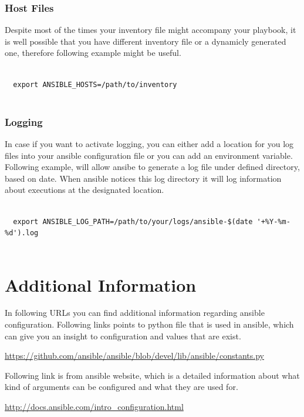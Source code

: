 \documentclass[10pt]{book}
\begin{document}
 

\subsubsection{Host Files}
Despite most of the times your inventory file might accompany your playbook, it 
is well possible that you have different inventory file or a dynamicly generated 
one, therefore following example might be useful.  

\begin{verbatim}
  
  export ANSIBLE_HOSTS=/path/to/inventory
   
\end{verbatim}



\subsubsection{Logging}
In case if you want to activate logging, you can either add a location for you 
log files into your ansible configuration file or you can add an environment 
variable. Following example, will allow ansibe to generate a log file under defined directory, 
based on date. When ansible notices this log directory it will log information about executions at the designated 
location.

\begin{verbatim}
  
  export ANSIBLE_LOG_PATH=/path/to/your/logs/ansible-$(date '+%Y-%m-%d').log
   
\end{verbatim}



\section{Additional Information}
In following URLs you can find additional information regarding ansible 
configuration. Following links points to python file that is used in ansible, 
which can give you an insight to configuration and values that are exist.

\url{https://github.com/ansible/ansible/blob/devel/lib/ansible/constants.py}

Following link is from ansible website, which is a detailed information about 
what kind of arguments can be configured and what they are used for.

\url{http://docs.ansible.com/intro_configuration.html}
\end{document}
